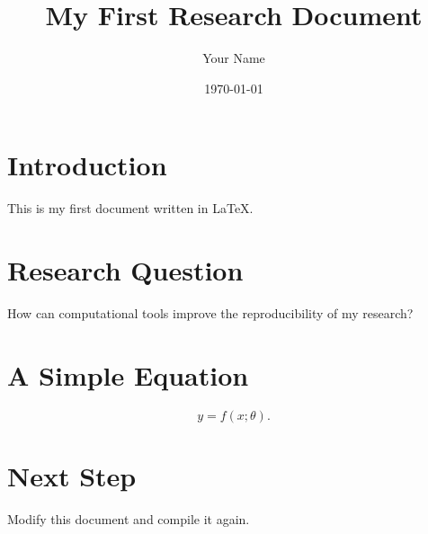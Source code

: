\documentclass[11pt]{article}
\title{My First Research Document}
\author{Your Name}
\date{\today}
\begin{document}
\maketitle

\section{Introduction}
This is my first document written in LaTeX.

\section{Research Question}
How can computational tools improve the reproducibility of my research?

\section{A Simple Equation}
\begin{equation}
y=f(x;\theta).
\end{equation}

\section{Next Step}
Modify this document and compile it again.
\end{document}

